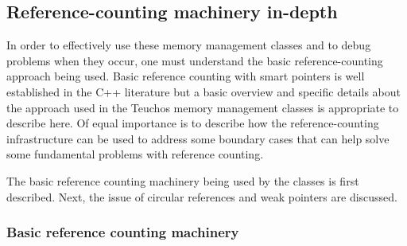 \documentclass[pdf,ps2pdf,11pt]{SANDreport}
\begin{document}
%
{}\subsection{Reference-counting machinery in-depth}
\label{sec:reference-counting-machinary}
%

In order to effectively use these memory management classes and to
debug problems when they occur, one must understand the basic
reference-counting approach being used.  Basic reference counting with
smart pointers is well established in the C++ literature
{}\cite{MoreEffectiveC++96} but a basic overview and specific details
about the approach used in the Teuchos memory management classes is
appropriate to describe here.  Of equal importance is to describe how
the reference-counting infrastructure can be used to address some
boundary cases that can help solve some fundamental problems with
reference counting.

The basic reference counting machinery being used by the classes is
first described.  Next, the issue of circular references and weak
pointers are discussed.


%
{}\subsubsection{Basic reference counting machinery}
\label{sec:basic-reference-counting-machinery}
%
\end{document}

